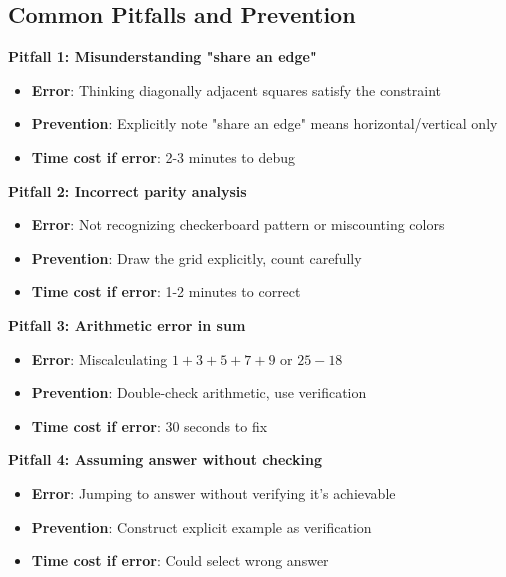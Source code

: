 \documentclass[11pt]{article}
\begin{document}
\begin{roadmapbox}
\subsection*{Common Pitfalls and Prevention}

\textbf{Pitfall 1: Misunderstanding "share an edge"}
\begin{itemize}[leftmargin=*]
    \item \textbf{Error}: Thinking diagonally adjacent squares satisfy the constraint
    \item \textbf{Prevention}: Explicitly note "share an edge" means horizontal/vertical only
    \item \textbf{Time cost if error}: 2-3 minutes to debug
\end{itemize}

\textbf{Pitfall 2: Incorrect parity analysis}
\begin{itemize}[leftmargin=*]
    \item \textbf{Error}: Not recognizing checkerboard pattern or miscounting colors
    \item \textbf{Prevention}: Draw the grid explicitly, count carefully
    \item \textbf{Time cost if error}: 1-2 minutes to correct
\end{itemize}

\textbf{Pitfall 3: Arithmetic error in sum}
\begin{itemize}[leftmargin=*]
    \item \textbf{Error}: Miscalculating $1+3+5+7+9$ or $25-18$
    \item \textbf{Prevention}: Double-check arithmetic, use verification
    \item \textbf{Time cost if error}: 30 seconds to fix
\end{itemize}

\textbf{Pitfall 4: Assuming answer without checking}
\begin{itemize}[leftmargin=*]
    \item \textbf{Error}: Jumping to answer without verifying it's achievable
    \item \textbf{Prevention}: Construct explicit example as verification
    \item \textbf{Time cost if error}: Could select wrong answer
\end{itemize}


\end{roadmapbox}
\end{document}
